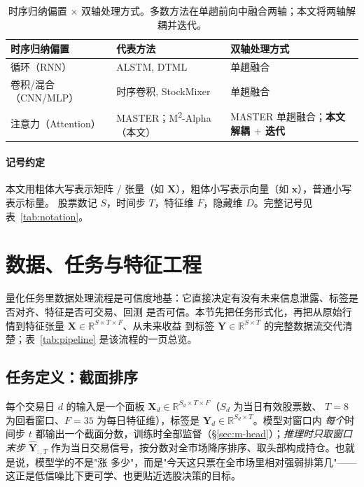 \documentclass[a4paper,11pt,fontset=fandol]{ctexart}
\newcommand{\msqa}{\texorpdfstring{M\textsuperscript{2}-Alpha}{M2-Alpha}} %
\begin{document}
\begin{table}[H]
\centering
\caption{时序归纳偏置 $\times$ 双轴处理方式。多数方法在单趟前向中融合两轴；本文将两轴解耦并迭代。}
\label{tab:cnn-track}
\begin{tabularx}{\linewidth}{l>{\raggedright\arraybackslash}X>{\raggedright\arraybackslash}X}
\toprule
时序归纳偏置 & 代表方法 & 双轴处理方式 \\
\midrule
循环（RNN）    & ALSTM, DTML            & 单趟融合 \\
卷积/混合（CNN/MLP） & 时序卷积, StockMixer & 单趟融合 \\
注意力（Attention） & MASTER；\msqa{}（本文） & MASTER 单趟融合；\textbf{本文解耦 $+$ 迭代} \\
\bottomrule
\end{tabularx}
\end{table}

\paragraph{记号约定}
本文用粗体大写表示矩阵 / 张量（如 $\bm{X}$），粗体小写表示向量（如 $\bm{x}$），普通小写表示标量。
股票数记 $S$，时间步 $T$，特征维 $F$，隐藏维 $D$。完整记号见表~\ref{tab:notation}。

\section{数据、任务与特征工程}\label{sec:data}
量化任务里数据处理流程是可信度地基：它直接决定有没有未来信息泄露、标签是否对齐、特征是否可交易、回测
是否可信。本节先把任务形式化，再把从原始行情到特征张量 $\bm{X}\in\mathbb{R}^{S\times T\times F}$、从未来收益
到标签 $\bm{Y}\in\mathbb{R}^{S\times T}$ 的完整数据流交代清楚；表~\ref{tab:pipeline} 是该流程的一页总览。

\subsection{任务定义：截面排序}\label{sec:data-task}
每个交易日 $d$ 的输入是一个面板 $\bm{X}_d\in\mathbb{R}^{S_d\times T\times F}$（$S_d$ 为当日有效股票数、
$T{=}8$ 为回看窗口、$F{=}35$ 为每日特征维），标签是 $\bm{Y}_d\in\mathbb{R}^{S_d\times T}$。模型对窗口内
\emph{每个}时间步 $t$ 都输出一个截面分数，训练时全部监督（§\ref{sec:m-head}）；\emph{推理时只取窗口末步}
$\hat{\bm{Y}}_{:,T}$ 作为当日交易信号，按分数对全市场降序排序、取头部构成持仓。也就是说，模型学的不是"涨
多少"，而是"今天这只票在全市场里相对强弱排第几"——这正是低信噪比下更可学、也更贴近选股决策的目标。
\end{document}
